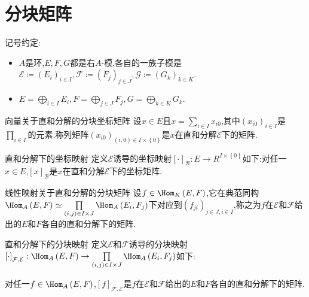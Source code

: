 \section{分块矩阵}

记号约定:

\begin{itemize}
	\item $A$是环,$E,F,G$都是右$A$-模,各自的一族子模是$\mathcal{E}\coloneq\left(E_{i}\right)_{i\in I},\mathcal{F}\coloneq\left(F_{j}\right)_{j\in J},\mathcal{G}\coloneq\left(G_{k}\right)_{k\in K}$.
	\item $E=\bigoplus\limits_{i\in I}E_{i},F=\bigoplus\limits_{j\in J}F_{j},G=\bigoplus\limits_{k\in K}G_{k}$.
\end{itemize}

\begin{definition}{向量关于直和分解的分块坐标矩阵}{}
	设$x\in E$且$x=\sum\limits_{i\in I}x_{i0}$,其中$\left(x_{i0}\right)_{i\in I}$是$\prod\limits_{i\in I}$的元素.称列矩阵$\left(x_{i0}\right)_{\left(i,0\right)\in I\times\left\{0\right\}}$是$x$在直和分解$\mathcal{E}$下的矩阵.
\end{definition}

\begin{definition}{直和分解下的坐标映射}{}
	定义$\mathcal{E}$诱导的坐标映射$\left[\cdot\right]_{\mathcal{B}}:E\to R^{I\times\left\{0\right\}}$如下:对任一$x\in E$,$\left[x\right]_{\mathcal{B}}$是$x$在直和分解$\mathcal{E}$下的坐标矩阵.
\end{definition}

\begin{definition}{线性映射关于直和分解的分块矩阵}{}
	设$f\in\Hom_{K}\left(E,F\right)$,它在典范同构$\Hom_{A}\left(E,F\right)\simeq\prod\limits_{\left(i,j\right)\in I\times J}\Hom_{A}\left(E_{i},F_{j}\right)$下对应到$\left(f_{ji}\right)_{j\in J,i\in I}$,称之为$f$在$\mathcal{E}$和$\mathcal{F}$给出的$E$和$F$各自的直和分解下的矩阵.
\end{definition}

\begin{definition}{直和分解下的分块映射}{}
	定义$\mathcal{E}$和$\mathcal{F}$诱导的分块映射$\left[\cdot\right]_{\mathcal{F},\mathcal{E}}:\Hom_{A}\left(E,F\right)\to\prod\limits_{\left(i,j\right)\in I\times J}\Hom_{A}\left(E_{i},F_{j}\right)$如下:
	\begin{center}
		对任一$f\in\Hom_{A}\left(E,F\right)$,$\left[f\right]_{\mathcal{F},\mathcal{E}}$是$f$在$\mathcal{E}$和$\mathcal{F}$给出的$E$和$F$各自的直和分解下的矩阵.
	\end{center}
\end{definition}

